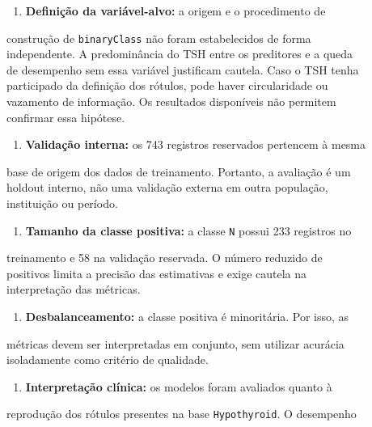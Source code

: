 \documentclass{article}
\begin{document}
\begin{enumerate}
  \item  \textbf{Definição da variável-alvo:} a origem e o procedimento de
\end{enumerate}
construção de \texttt{binaryClass} não foram estabelecidos de forma \\
independente. A predominância do TSH entre os preditores e a queda \\
de desempenho sem essa variável justificam cautela. Caso o TSH tenha \\
participado da definição dos rótulos, pode haver circularidade ou \\
vazamento de informação. Os resultados disponíveis não permitem \\
confirmar essa hipótese. \\
\begin{enumerate}
  \item  \textbf{Validação interna:} os 743 registros reservados pertencem à mesma
\end{enumerate}
base de origem dos dados de treinamento. Portanto, a avaliação é um \\
holdout interno, não uma validação externa em outra população, \\
instituição ou período. \\
\begin{enumerate}
  \item  \textbf{Tamanho da classe positiva:} a classe \texttt{N} possui 233 registros no
\end{enumerate}
treinamento e 58 na validação reservada. O número reduzido de \\
positivos limita a precisão das estimativas e exige cautela na \\
interpretação das métricas. \\
\begin{enumerate}
  \item  \textbf{Desbalanceamento:} a classe positiva é minoritária. Por isso, as
\end{enumerate}
métricas devem ser interpretadas em conjunto, sem utilizar acurácia \\
isoladamente como critério de qualidade. \\
\begin{enumerate}
  \item  \textbf{Interpretação clínica:} os modelos foram avaliados quanto à
\end{enumerate}
reprodução dos rótulos presentes na base \texttt{Hypothyroid}. O desempenho \\
\end{document}
